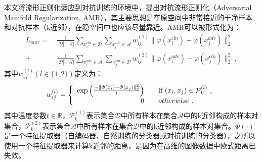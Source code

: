 本文将流形正则化适应到对抗训练的环境中，提出对抗流形正则化（Adversarial Manifold Regularization, AMR），其主要思想是在原空间中非常接近的干净样本和对抗样本（k近邻），在隐空间中也应该尽量靠近。AMR可以被形式化为：
\begin{equation}
\begin{aligned}
    L_{amr}
    = \ &
    \frac{1}{|\mathcal{D}| \cdot |\mathcal{A}|} \sum_{x_i^{cln} \in \mathcal{D}} \sum_{x_j^{adv} \in \mathcal{A}} w_{ij}^{(1)} \big\|\varphi(x_i^{cln}) - \varphi(x_j^{adv})\big\|_2^2 \\
    + & 
    \frac{1}{|\mathcal{D}| \cdot |\mathcal{A}|} \sum_{x_i^{adv} \in \mathcal{A}} \sum_{x_j^{cln} \in \mathcal{D}} w_{ij}^{(2)} \big\|\varphi(x_i^{adv}) - \varphi(x_j^{cln})\big\|_2^2
    \ ,
\end{aligned}
\end{equation}
其中$w_{ij}^{(l)}(l\in\{1, 2\})$定义为：
\begin{equation}
    w_{ij}^{(l)} = \left\{
    \begin{array}{rl}
    \exp \left(\frac{-\left\|\varPhi(x_i)-\varPhi(x_j)\right\|_2^2}{t}\right)  & \quad \textnormal{if } (x_i, x_j) \in \mathcal{P}_{k}^{(l)} \ ,\\
    0  & \quad otherwise \ .
    \end{array} \right.
\end{equation}
其中温度参数$t \in \mathbb{R}$，$\mathcal{P}_{k}^{(1)}$表示集合$\mathcal{D}$中所有样本在集合$\mathcal{A}$中的k近邻构成的样本对集合，$\mathcal{P}_{k}^{(2)}$表示集合$\mathcal{A}$中所有样本在集合$\mathcal{D}$中的k近邻构成的样本对集合。$\varPhi(\cdot)$是一个特征提取器（自编码器、自然训练的分类器或对抗训练的分类器），之所以使用一个特征提取器来计算k近邻的距离，是因为在高维的图像数据中欧式距离已失效。